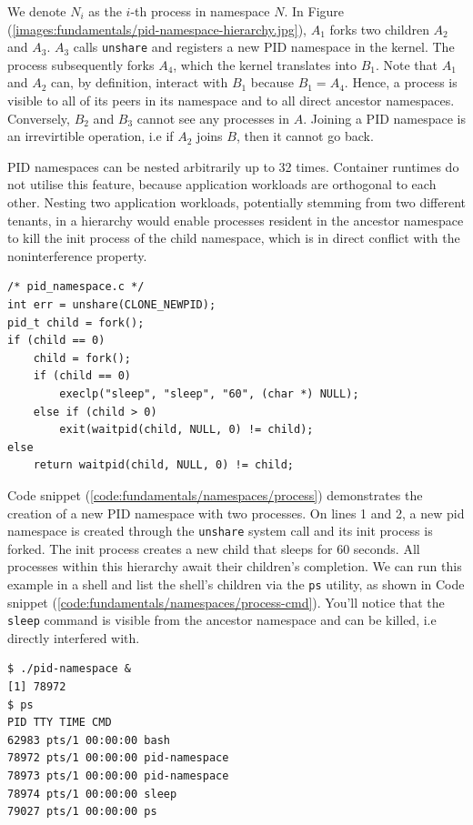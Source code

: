 We denote $N_{i}$ as the $i$-th process in namespace $N$. 
In Figure (\ref{images:fundamentals/pid-namespace-hierarchy.jpg}),
$A_{1}$ forks two children $A_{2}$ and $A_{3}$. 
$A_{3}$ calls \verb|unshare| and registers a new PID namespace in the kernel. The process 
subsequently forks $A_{4}$, which the kernel translates into $B_{1}$.
Note that $A_{1}$ and $A_{2}$ can, by definition, interact with $B_{1}$ because $B_{1} = A_{4}$.  
Hence, a process is visible to all of its peers in its namespace and to all direct ancestor
namespaces. Conversely, $B_{2}$ and $B_{3}$ cannot see any processes in $A$. 
Joining a PID namespace is an irrevirtible operation, i.e if $A_{2}$ joins $B$,
then it cannot go back.

PID namespaces can be nested arbitrarily up to 32 times. 
Container runtimes do not utilise this feature, because application workloads are orthogonal 
to each other. Nesting two application workloads, potentially stemming from two different tenants, in a hierarchy
would enable processes resident in the ancestor namespace to kill the init process of the child namespace, which 
is in direct conflict with the noninterference property. 

\begin{lstlisting}[style=c-code-snippets, label={code:fundamentals/namespaces/process}, caption={PID namespace creation pseudocode}]
/* pid_namespace.c */
int err = unshare(CLONE_NEWPID);
pid_t child = fork();
if (child == 0) 
    child = fork();
    if (child == 0)
        execlp("sleep", "sleep", "60", (char *) NULL);
    else if (child > 0)
        exit(waitpid(child, NULL, 0) != child);
else 
    return waitpid(child, NULL, 0) != child;
\end{lstlisting}

Code snippet (\ref{code:fundamentals/namespaces/process}) demonstrates the creation of a new 
PID namespace with two processes. On lines 1 and 2, a new 
pid namespace is created through the \verb|unshare| system call and its init process is forked. 
The init process creates a new child that sleeps for 60 seconds. All processes within this 
hierarchy await their children's completion. 
We can run this example in a shell and list the shell's children via the \verb|ps|
utility, as shown in Code snippet (\ref{code:fundamentals/namespaces/process-cmd}). 
You'll notice that the \verb|sleep| command is visible from the ancestor namespace and can be killed,
i.e directly interfered with. 
\begin{lstlisting}[label={code:fundamentals/namespaces/process-cmd}, style=bash, caption={Example of creating a PID namespace and listing all processes in the child namespace from a process in the parent namespace}]
$ ./pid-namespace &
[1] 78972
$ ps
PID TTY TIME CMD
62983 pts/1 00:00:00 bash
78972 pts/1 00:00:00 pid-namespace
78973 pts/1 00:00:00 pid-namespace
78974 pts/1 00:00:00 sleep
79027 pts/1 00:00:00 ps
\end{lstlisting}

